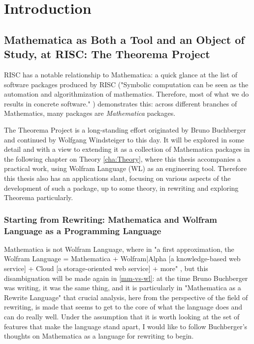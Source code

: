 \chapter{Introduction}
\label{cha:Introduction}


\section{Mathematica as Both a Tool and an Object of Study, at RISC: The Theorema Project}

RISC has a notable relationship to Mathematica: a quick glance at the list of software packages produced by RISC ("Symbolic computation can be seen as the automation and algorithmization of mathematics. Therefore, most of what we do results in concrete software." \cite{noauthor_software_nodate}) demonstrates this: across different branches of Mathematics, many packages are \textit{Mathematica} packages.

The Theorema Project is a long-standing effort originated by Bruno Buchberger and continued by Wolfgang Windsteiger to this day. It will be explored in some detail and with a view to extending it as a collection of Mathematica packages in the following chapter on Theory \ref{cha:Theory}, where this thesis accompanies a practical work, using Wolfram Language (WL) as an engineering tool. Therefore this thesis also has an applications slant, focusing on various aspects of the development of such a package, up to some theory, in rewriting and exploring Theorema particularly.

\subsection{Starting from Rewriting: Mathematica and Wolfram Language as a Programming Language} \label{rewriting}

Mathematica is not Wolfram Language, where in "a first approximation, the Wolfram Language = Mathematica + Wolfram|Alpha [a knowledge-based web service] + Cloud [a storage-oriented web service] + more" \cite{noauthor_wolfram_nodate}, but this disambiguation will be made again in \ref{mm-vs-wl}: at the time Bruno Buchberger was writing, it was the same thing, and it is particularly in "Mathematica as a Rewrite Language" \cite{buchberger_mathematica_1996} that crucial analysis, here from the perspective of the field of rewriting, is made that seems to get to the core of what the language does and can do really well. Under the assumption that it is worth looking at the set of features that make the language stand apart, I would like to follow Buchberger's thoughts on Mathematica as a language for rewriting to begin.

